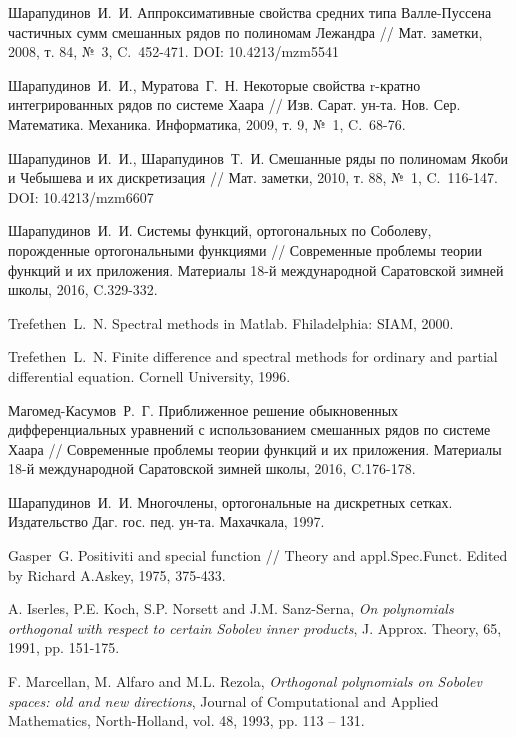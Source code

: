  Шарапудинов~И.~И. Аппроксимативные свойства средних типа Валле-Пуссена частичных сумм смешанных рядов по полиномам Лежандра // Мат. заметки, 2008, т. 84, №~3, C.~452-471. DOI: 10.4213/mzm5541

 Шарапудинов~И.~И., Муратова~Г.~Н. Некоторые свойства r-кратно интегрированных рядов по системе Хаара // Изв. Сарат. ун-та. Нов. Сер. Математика. Механика. Информатика, 2009, т. 9, №~1, C.~68-76.

 Шарапудинов~И.~И., Шарапудинов~Т.~И. Смешанные ряды по полиномам Якоби и Чебышева и их дискретизация // Мат. заметки, 2010, т. 88, №~1, C.~116-147. DOI: 10.4213/mzm6607

 Шарапудинов~И.~И. Системы функций, ортогональных по Соболеву, порожденные ортогональными функциями // Современные проблемы теории функций и их приложения.  Материалы 18-й международной Саратовской зимней школы, 2016, C.329-332.

 Trefethen~L.~N. Spectral methods in Matlab. Fhiladelphia: SIAM, 2000.

 Trefethen~L.~N. Finite difference and spectral methods for ordinary and partial differential equation. Cornell University, 1996.

 Магомед-Касумов~Р.~Г. Приближенное решение обыкновенных дифференциальных уравнений с использованием смешанных рядов по системе Хаара // Современные проблемы теории функций и их приложения.  Материалы 18-й международной Саратовской зимней школы, 2016, C.176-178.

 Шарапудинов~И.~И. Многочлены, ортогональные на дискретных сетках. Издательство Даг. гос. пед. ун-та. Махачкала, 1997.

 Gasper~G. Positiviti and special function // Theory and appl.Spec.Funct. Edited by Richard A.Askey, 1975, 375-433.



A. Iserles, P.E. Koch, S.P. Norsett and J.M. Sanz-Serna,
\textit{On polynomials  orthogonal  with respect  to certain Sobolev inner products},
J. Approx. Theory, 65, 1991, pp. 151-175.



F. Marcellan, M. Alfaro and M.L. Rezola,
\textit{Orthogonal polynomials on Sobolev spaces: old and new directions},
Journal of Computational and Applied Mathematics, North-Holland, vol. 48, 1993, pp. 113 -- 131.



